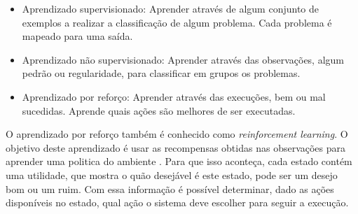 \begin{itemize}
	\item Aprendizado supervisionado: Aprender através de algum conjunto de exemplos a realizar a classificação de algum problema. Cada problema é mapeado para uma saída. 
	\item Aprendizado não supervisionado: Aprender através das observações, algum pedrão ou regularidade, para classificar em grupos os problemas.
	\item Aprendizado por reforço: Aprender através das execuções, bem ou mal sucedidas. Aprende quais ações são melhores de ser executadas.
\end{itemize}



O aprendizado por reforço também é conhecido como \textit{reinforcement learning}. O objetivo deste aprendizado é usar as recompensas obtidas nas observações para aprender uma politica do ambiente \cite{intelligence2003modern}. Para que isso aconteça, cada estado contém uma utilidade, que mostra o quão desejável é este estado, pode ser um desejo bom ou um ruim. Com essa informação é possível determinar, dado as ações disponíveis no estado, qual ação o sistema deve escolher para seguir a execução. 





